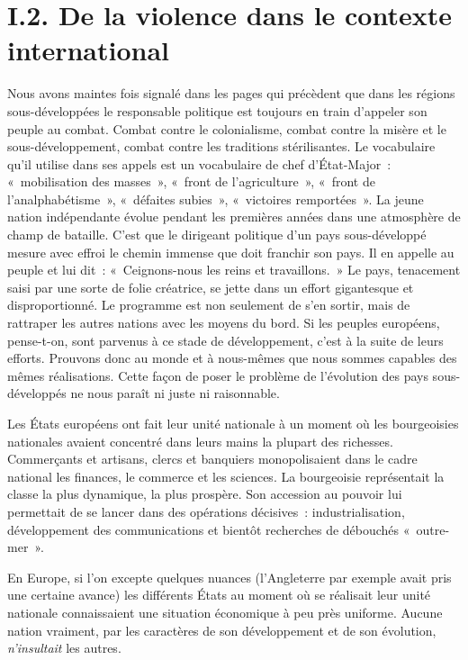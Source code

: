 \documentclass[french,twoside]{book} %
\begin{document}
 \section[{I.2. De la violence dans le contexte international}]{I.2. De la violence dans le contexte international}
\noindent Nous avons maintes fois signalé dans les pages qui précèdent que dans les régions sous-développées le responsable politique est toujours en train d’appeler son peuple au combat. Combat contre le colonialisme, combat contre la misère et le sous-développement, combat contre les traditions stérilisantes. Le vocabulaire qu’il utilise dans ses appels est un vocabulaire de chef d’État-Major : « mobilisation des masses », « front de l’agriculture », « front de l’analphabétisme », « défaites subies », « victoires remportées ». La jeune nation indépendante évolue pendant les premières années dans une atmosphère de champ de bataille. C’est que le dirigeant politique d’un pays sous-développé mesure avec effroi le chemin immense que doit franchir son pays. Il en appelle au peuple et lui dit : « Ceignons-nous les reins et travaillons. » Le pays, tenacement saisi par une sorte de folie créatrice, se jette dans un effort gigantesque et disproportionné. Le programme est non seulement de s’en sortir, mais de rattraper les autres nations avec les moyens du bord. Si les peuples européens, pense-t-on, sont parvenus à ce stade de développement, c’est à la suite de leurs efforts. Prouvons donc au monde et à nous-mêmes que nous sommes capables des mêmes réalisations. Cette façon de poser le problème de l’évolution des pays sous-développés ne nous paraît ni juste ni raisonnable.\par
\bigbreak
\noindent Les États européens ont fait leur unité nationale à un moment où les bourgeoisies nationales avaient concentré dans leurs mains la plupart des richesses. Commerçants et artisans, clercs et banquiers monopolisaient dans le cadre national les   finances, le commerce et les sciences. La bourgeoisie représentait la classe la plus dynamique, la plus prospère. Son accession au pouvoir lui permettait de se lancer dans des opérations décisives : industrialisation, développement des communications et bientôt recherches de débouchés « outre-mer ».\par
En Europe, si l’on excepte quelques nuances (l’Angleterre par exemple avait pris une certaine avance) les différents États au moment où se réalisait leur unité nationale connaissaient une situation économique à peu près uniforme. Aucune nation vraiment, par les caractères de son développement et de son évolution, \emph{n’insultait} les autres.\par
\end{document}
